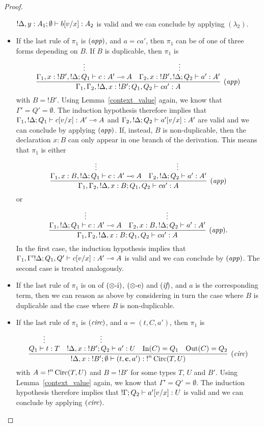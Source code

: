 \documentclass[twoside]{article}
\begin{document}
\begin{proof}
\begin{itemize}
 ${!}\Delta,y:A_1;\emptyset \vdash b[v/x]:A_2$ is valid and we can conclude
 by applying $(\lambda_2)$.
 \item If the last rule of $\pi_1$ is $(\textit{app})$, and $a=ca'$, then $\pi_1$ can 
 be of one of three forms depending on $B$. If $B$ is duplicable, then $\pi_1$ is
 \[
 \infer[(\rul{app})]{\Gamma_1,\Gamma_2,{!}\Delta,x:{!}B';Q_1,Q_2\entails ca':A}{
    \deduce[]{\Gamma_1, x:{!}B',{!}\Delta;Q_1\entails c:A'\loli A}{
      \vdots
    }
    &
    \deduce[]{\Gamma_2, x:{!}B',{!}\Delta ;Q_2\entails a':A' }{
      \vdots
    }
 }
 \]
 with $B={!}B'$. Using 
 Lemma~\hyperref[context_value]{\ref*{context_value}} again, we 
 know that $\Gamma'=Q'=\emptyset$. The induction hypothesis therefore 
 implies that $\Gamma_1,{!}\Delta;Q_1\vdash c[v/x]:A'\multimap A$ and 
 $\Gamma_2,{!}\Delta ;Q_2\vdash a'[v/x]:A'$ are valid and we can conclude 
 by applying $(\textit{app})$. If, instead, $B$ is non-duplicable, then the declaration 
 $x:B$ can only appear in one branch of the derivation. This means that $\pi_1$ 
 is either 
  \[
 \infer[(\rul{app})]{\Gamma_1,\Gamma_2,{!}\Delta,x:B;Q_1,Q_2\entails ca':A}{
    \deduce[]{\Gamma_1, x:B,{!}\Delta;Q_1\entails c:A'\loli A}{
      \vdots
    }
    &
    \deduce[]{\Gamma_2, {!}\Delta ;Q_2\entails a':A'}{
      \vdots
    }     
 }
 \]
 or
  \[
 \infer[(\rul{app}).]{\Gamma_1,\Gamma_2,{!}\Delta,x:B;Q_1,Q_2\entails ca':A}{
    \deduce[]{\Gamma_1, {!}\Delta;Q_1\entails c:A'\loli A}{ 
      \vdots
    }
    &
    \deduce[]{\Gamma_2, x:B,{!}\Delta ;Q_2\entails a':A'}{
      \vdots
    }     
 }
 \]
 In the first case, the induction hypothesis implies that 
 $\Gamma_1,\Gamma' {!}\Delta;Q_1,Q'\vdash c[v/x]:A'\multimap A$ is valid and 
 we can conclude by $(\textit{app})$. The second case is treated analogously.
 \item If the last rule of $\pi_1$ is on of $(\otimes\mbox{-i})$, $(\otimes\mbox{-e})$ 
 and $(\textit{if})$, and $a$ is the corresponding term, then we can reason as above
 by considering in turn the case where $B$ is duplicable and the case where
 $B$ is non-duplicable.
 \item If the last rule of $\pi_1$ is $(\textit{circ})$, and $a=(t,C,a')$, then 
 $\pi_1$ is
 \[
 \infer[(\rul{circ})]{{!}\Delta,x:{!}B';\emptyset \entails (t,\mathbf{c},a'):{!}^n\Circ(T,U)}{
    \deduce[]{Q_1\entails t:T}{
      \vdots
    }    
    &
    \deduce[]{{!}\Delta,x:{!}B' ; Q_2\entails a':U}{
      \vdots
    }     
    &
    \In(C)=Q_1 
    &
    \Out(C)=Q_2
 }
 \]
 with $A={!}^n\mathop{\textrm{Circ}}\nolimits(T,U)$ and $B={!}B'$ for some types $T$, $U$ and $B'$. Using  
 Lemma~\hyperref[context_value]{\ref*{context_value}} again, we know 
 that $\Gamma'=Q'=\emptyset$. The induction hypothesis therefore implies that
 ${!}\Gamma; Q_2\vdash a'[v/x]:U$ is valid and we can conclude
 by applying $(\textit{circ})$.
\end{itemize}
\end{proof}
\end{document}
